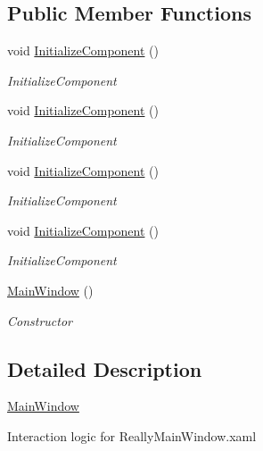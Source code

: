 \subsection*{Public Member Functions}
\begin{DoxyCompactItemize}
\item 
void \hyperlink{class_baudi_1_1_client_1_1_view_1_1_main_window_a838134dc4daa5b13cdfcfbe36bbd9770}{Initialize\+Component} ()
\begin{DoxyCompactList}\small\item\em Initialize\+Component \end{DoxyCompactList}\item 
void \hyperlink{class_baudi_1_1_client_1_1_view_1_1_main_window_a838134dc4daa5b13cdfcfbe36bbd9770}{Initialize\+Component} ()
\begin{DoxyCompactList}\small\item\em Initialize\+Component \end{DoxyCompactList}\item 
void \hyperlink{class_baudi_1_1_client_1_1_view_1_1_main_window_a838134dc4daa5b13cdfcfbe36bbd9770}{Initialize\+Component} ()
\begin{DoxyCompactList}\small\item\em Initialize\+Component \end{DoxyCompactList}\item 
void \hyperlink{class_baudi_1_1_client_1_1_view_1_1_main_window_a838134dc4daa5b13cdfcfbe36bbd9770}{Initialize\+Component} ()
\begin{DoxyCompactList}\small\item\em Initialize\+Component \end{DoxyCompactList}\item 
\hyperlink{class_baudi_1_1_client_1_1_view_1_1_main_window_abd79c83520da924e370119ba377b4373}{Main\+Window} ()
\begin{DoxyCompactList}\small\item\em Constructor \end{DoxyCompactList}\end{DoxyCompactItemize}


\subsection{Detailed Description}
\hyperlink{class_baudi_1_1_client_1_1_view_1_1_main_window}{Main\+Window} 

Interaction logic for Really\+Main\+Window.\+xaml 

